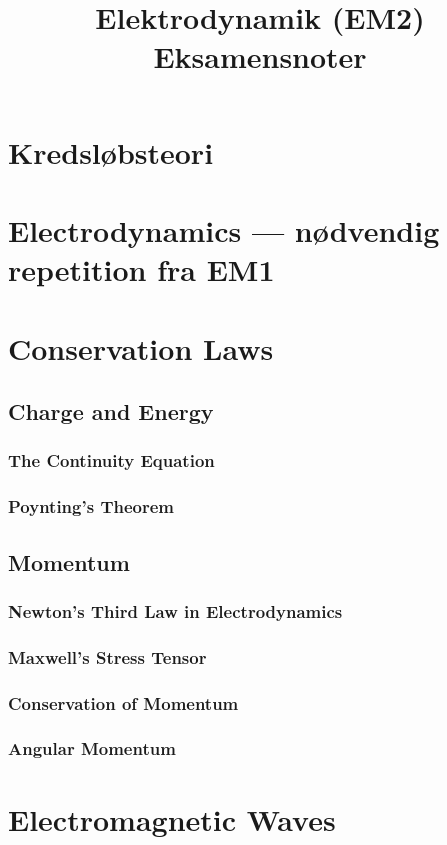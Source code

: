 \documentclass[11pt,a4paper]{article}
\title{Elektrodynamik (EM2)\\Eksamensnoter}
\author{}\date{}
\begin{document}
\maketitle
\tableofcontents
\newpage
\section*{Kredsløbsteori}
\setcounter{section}{6}
\section{Electrodynamics --- nødvendig repetition fra EM1}
\section{Conservation Laws}
\subsection{Charge and Energy}
\subsubsection{The Continuity Equation}
\subsubsection{Poynting's Theorem}
\subsection{Momentum}
\subsubsection{Newton's Third Law in Electrodynamics}
\subsubsection{Maxwell's Stress Tensor}
\subsubsection{Conservation of Momentum}
\subsubsection{Angular Momentum}
\section{Electromagnetic Waves}
\end{document}

